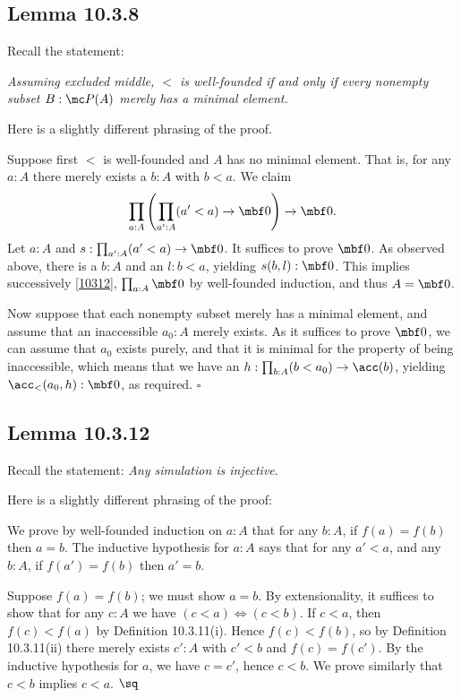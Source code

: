 \documentclass[12pt]{article}
\begin{document}

\subsection{Lemma 10.3.8}

Recall the statement: 

\emph{Assuming excluded middle, $<$ is well-founded if and only if every nonempty subset $B:\mc P(A)$ merely has a minimal element.} 

Here is a slightly different phrasing of the proof.

Suppose first $<$ is well-founded and $A$ has no minimal element. That is, for any $a:A$ there merely exists a $b:A$ with $b<a$. We claim 
\begin{equation}\label{10312}
\prod_{a:A}\left(\prod_{a':A}(a'<a)\to\mbf0\right)\to\mbf0.
\end{equation}
Let $a:A$ and $s:\prod_{a':A}(a'<a)\to\mbf0$. It suffices to prove $\mbf0$. As observed above, there is a $b:A$ and an $l:b<a$, yielding $s(b,l):\mbf0$. This implies successively \eqref{10312}, $\prod_{a:A}\mbf0$ by well-founded induction, and thus $A=\mbf0$. 

Now suppose that each nonempty subset merely has a minimal element, and assume that an inaccessible $a_0:A$ merely exists. As it suffices to prove $\mbf0$, we can assume that $a_0$ exists purely, and that it is minimal for the property of being inaccessible, which means that we have an $h:\prod_{b:A}(b<a_0)\to\acc(b)$, yielding $\acc_<(a_0,h):\mbf0$, as required. $\square$


\subsection{Lemma 10.3.12}

Recall the statement: \emph{Any simulation is injective}.

Here is a slightly different phrasing of the proof:

We prove by well-founded induction on $a:A$ that for any $b:A$, if $f(a)=f(b)$ then $a=b$. The inductive hypothesis for $a:A$ says that for any $a'<a$, and any $b:A$, if $f(a')=f(b)$ then $a'=b$.

Suppose $f(a)=f(b)$; we must show $a=b$. By extensionality, it suffices to show that for any $c:A$ we have $(c<a)\Leftrightarrow(c<b)$. If $c<a$, then $f(c)<f(a)$ by Definition 10.3.11(i). Hence $f(c)<f(b)$, so by Definition 10.3.11(ii) there merely exists $c':A$ with $c'<b$ and $f(c)=f(c')$. By the inductive hypothesis for $a$, we have $c=c'$, hence $c<b$. We prove similarly that $c<b$ implies $c<a$. $\sq$
\end{document}
